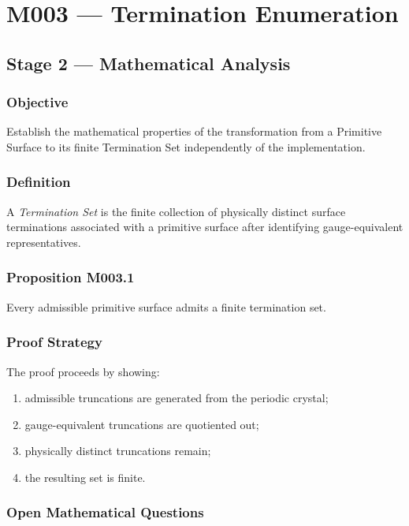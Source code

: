 \chapter{M003 --- Termination Enumeration}

\section{Stage 2 --- Mathematical Analysis}

\subsection{Objective}

Establish the mathematical properties of the transformation from a
Primitive Surface to its finite Termination Set independently of the
implementation.

\subsection{Definition}

A \emph{Termination Set} is the finite collection of physically distinct
surface terminations associated with a primitive surface after
identifying gauge-equivalent representatives.

\subsection{Proposition M003.1}

Every admissible primitive surface admits a finite termination set.

\subsection{Proof Strategy}

The proof proceeds by showing:

\begin{enumerate}
\item admissible truncations are generated from the periodic crystal;
\item gauge-equivalent truncations are quotiented out;
\item physically distinct truncations remain;
\item the resulting set is finite.
\end{enumerate}

\subsection{Open Mathematical Questions}

